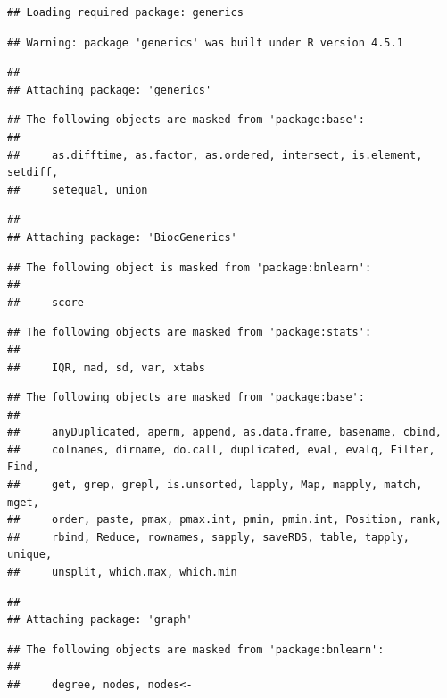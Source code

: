 \documentclass[
]{article}
\begin{document}
\begin{verbatim}
## Loading required package: generics
\end{verbatim}

\begin{verbatim}
## Warning: package 'generics' was built under R version 4.5.1
\end{verbatim}

\begin{verbatim}
## 
## Attaching package: 'generics'
\end{verbatim}

\begin{verbatim}
## The following objects are masked from 'package:base':
## 
##     as.difftime, as.factor, as.ordered, intersect, is.element, setdiff,
##     setequal, union
\end{verbatim}

\begin{verbatim}
## 
## Attaching package: 'BiocGenerics'
\end{verbatim}

\begin{verbatim}
## The following object is masked from 'package:bnlearn':
## 
##     score
\end{verbatim}

\begin{verbatim}
## The following objects are masked from 'package:stats':
## 
##     IQR, mad, sd, var, xtabs
\end{verbatim}

\begin{verbatim}
## The following objects are masked from 'package:base':
## 
##     anyDuplicated, aperm, append, as.data.frame, basename, cbind,
##     colnames, dirname, do.call, duplicated, eval, evalq, Filter, Find,
##     get, grep, grepl, is.unsorted, lapply, Map, mapply, match, mget,
##     order, paste, pmax, pmax.int, pmin, pmin.int, Position, rank,
##     rbind, Reduce, rownames, sapply, saveRDS, table, tapply, unique,
##     unsplit, which.max, which.min
\end{verbatim}

\begin{verbatim}
## 
## Attaching package: 'graph'
\end{verbatim}

\begin{verbatim}
## The following objects are masked from 'package:bnlearn':
## 
##     degree, nodes, nodes<-
\end{verbatim}
\end{document}
